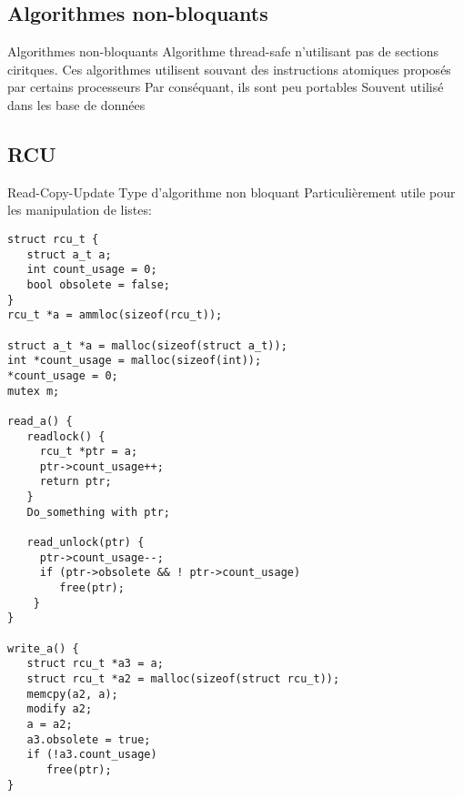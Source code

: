 \subsection{Algorithmes non-bloquants}
\begin{frame}{Algorithmes non-bloquants}
Algorithme thread-safe n'utilisant pas de sections ciritques. 
Ces algorithmes utilisent souvant des instructions atomiques proposés par certains processeurs
Par conséquant, ils sont peu portables
Souvent utilisé dans les base de données
\end{frame} 

\subsection{RCU}
\begin{frame}[fragile]{Read-Copy-Update}
Type d'algorithme non bloquant
Particulièrement utile pour les manipulation de listes:

\begin{lstlisting} 
struct rcu_t {
   struct a_t a;
   int count_usage = 0;
   bool obsolete = false;
}
rcu_t *a = ammloc(sizeof(rcu_t)); 

struct a_t *a = malloc(sizeof(struct a_t));
int *count_usage = malloc(sizeof(int));
*count_usage = 0;
mutex m;

read_a() {
   readlock() {
     rcu_t *ptr = a;
     ptr->count_usage++;
     return ptr;
   }
   Do_something with ptr;

   read_unlock(ptr) {
     ptr->count_usage--;
     if (ptr->obsolete && ! ptr->count_usage)
        free(ptr);
    }
}

write_a() { 
   struct rcu_t *a3 = a;
   struct rcu_t *a2 = malloc(sizeof(struct rcu_t));
   memcpy(a2, a);
   modify a2;   
   a = a2;  
   a3.obsolete = true;
   if (!a3.count_usage)
      free(ptr);
}
\end{lstlisting} 
\end{frame} 
